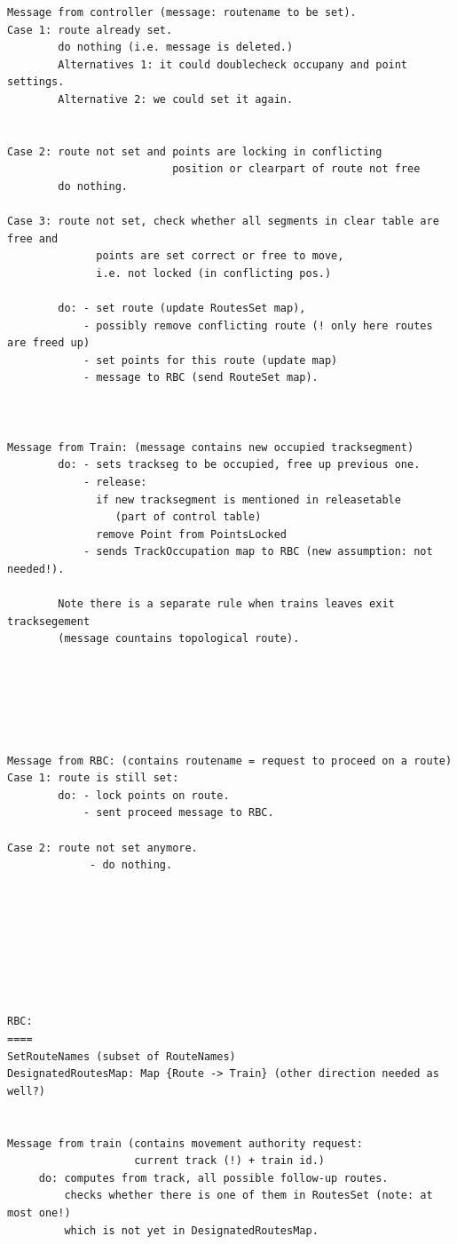 \begin{verbatim}
Message from controller (message: routename to be set).
Case 1: route already set.
        do nothing (i.e. message is deleted.)
        Alternatives 1: it could doublecheck occupany and point settings.
        Alternative 2: we could set it again. 


Case 2: route not set and points are locking in conflicting 
                          position or clearpart of route not free
        do nothing.

Case 3: route not set, check whether all segments in clear table are free and 
              points are set correct or free to move, 
              i.e. not locked (in conflicting pos.)
 
        do: - set route (update RoutesSet map), 
            - possibly remove conflicting route (! only here routes are freed up) 
            - set points for this route (update map)
            - message to RBC (send RouteSet map).
          


Message from Train: (message contains new occupied tracksegment)
        do: - sets trackseg to be occupied, free up previous one.
            - release: 
              if new tracksegment is mentioned in releasetable 
                 (part of control table)
              remove Point from PointsLocked
            - sends TrackOccupation map to RBC (new assumption: not needed!).
               
        Note there is a separate rule when trains leaves exit tracksegement
        (message countains topological route).

         



          
Message from RBC: (contains routename = request to proceed on a route)
Case 1: route is still set:
        do: - lock points on route.
            - sent proceed message to RBC.
 
Case 2: route not set anymore.
             - do nothing.








RBC:
====
SetRouteNames (subset of RouteNames)
DesignatedRoutesMap: Map {Route -> Train} (other direction needed as well?)


Message from train (contains movement authority request:
                    current track (!) + train id.)
     do: computes from track, all possible follow-up routes.
         checks whether there is one of them in RoutesSet (note: at most one!)
         which is not yet in DesignatedRoutesMap.


\end{verbatim}
